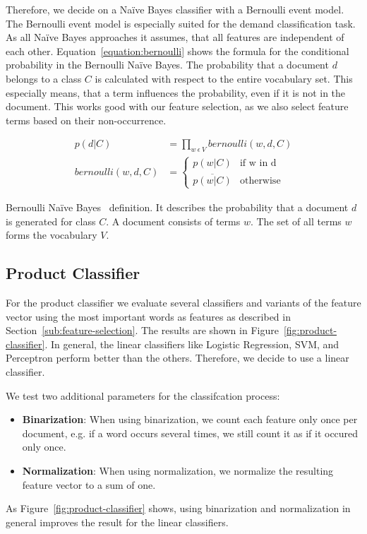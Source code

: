 Therefore, we decide on a Na\"{i}ve Bayes classifier with a Bernoulli event model.
The Bernoulli event model is especially suited for the demand classification task.
As all Na\"{i}ve Bayes approaches it assumes, that all features are independent of each other.
Equation~\ref{equation:bernoulli} shows the formula for the conditional probability in the Bernoulli Na\"{i}ve Bayes.
The probability that a document $d$ belongs to a class $C$ is calculated with respect to the entire vocabulary set.
This especially means, that a term influences the probability, even if it is not in the document.
This works good with our feature selection, as we also select feature terms based on their non-occurrence.

\captionsetup{singlelinecheck=off}
\begin{equationBlock}
\begin{align*}
	p(d|C) &= \prod_{w~\epsilon~V} bernoulli(w, d, C) \\
	bernoulli(w, d, C) &=
	\begin{cases}
		p(w|C) 					&\text{if w in d}\\
		\overline{p(w|C)} 		&\text{otherwise}
	\end{cases}
	\end{align*}
	\caption{
		Bernoulli Na\"{i}ve Bayes~\cite{mccallum1998comparison} definition.
		It describes the probability that a document $d$ is generated for class $C$.
		A document consists of terms $w$.
		The set of all terms $w$ forms the vocabulary $V$.
	}
	\label{equation:bernoulli}
\end{equationBlock}

\subsection{Product Classifier}
For the product classifier we evaluate several classifiers and variants of the feature vector using the most important words as features as described in Section~\ref{sub:feature-selection}.
The results are shown in Figure~\ref{fig:product-classifier}.
In general, the linear classifiers like Logistic Regression, SVM, and Perceptron perform better than the others.
Therefore, we decide to use a linear classifier.

We test two additional parameters for the classifcation process:
\begin{itemize}
	\item
		\textbf{Binarization}:
			When using binarization, we count each feature only once per document, e.g. if a word occurs several times, we still count it as if it occured only once.
	\item
		\textbf{Normalization}:
			When using normalization, we normalize the resulting feature vector to a sum of one.
\end{itemize}
As Figure~\ref{fig:product-classifier} shows, using binarization and normalization in general improves the result for the linear classifiers.

